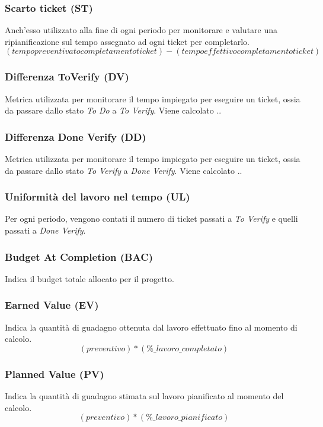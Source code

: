 \subsubsection{Scarto ticket (ST)}
Anch'esso utilizzato alla fine di ogni periodo per monitorare e valutare una ripianificazione sul tempo assegnato ad ogni ticket per completarlo. 
\[
    (tempo preventivato completamento ticket)-(tempo effettivo completamento ticket)
\]

\subsubsection{Differenza ToVerify (DV)}
Metrica utilizzata per monitorare il tempo impiegato per eseguire un ticket, ossia da passare dallo stato \textit{To Do} a \textit{To Verify}. Viene calcolato ..

\subsubsection{Differenza Done Verify (DD)}
Metrica utilizzata per monitorare il tempo impiegato per eseguire un ticket, ossia da passare dallo stato \textit{To Verify} a \textit{Done Verify}. Viene calcolato ..

\subsubsection{Uniformità del lavoro nel tempo (UL)}
Per ogni periodo, vengono contati il numero di ticket passati a \textit{To Verify} e quelli passati a \textit{Done Verify}.

\subsubsection{Budget At Completion (BAC)}
Indica il budget totale allocato per il progetto.

\subsubsection{Earned Value (EV)}
Indica la quantità di guadagno ottenuta dal lavoro effettuato fino al momento di calcolo.
\[
    (preventivo)*(\%\_lavoro\_completato)
\]

\subsubsection{Planned Value (PV)}
Indica la quantità di guadagno stimata sul lavoro pianificato al momento del calcolo.
\[
    (preventivo)*(\%\_lavoro\_pianificato)
\]

